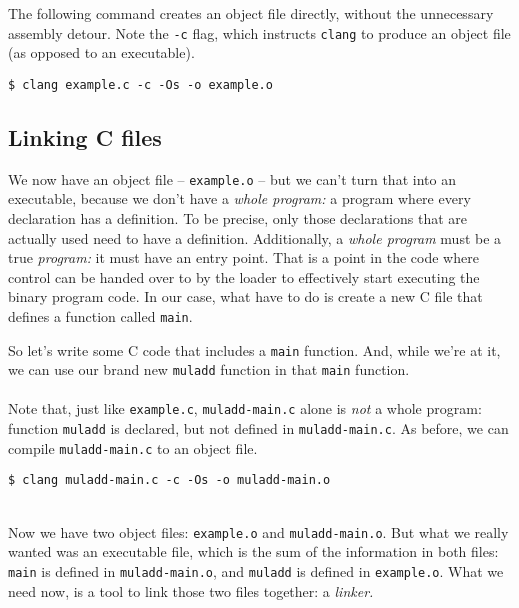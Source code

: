\documentclass[12pt,a4paper]{article}
\newcommand{\C}{C}
\newcommand{\clang}{\texttt{clang}}
\newcommand{\CC}{\clang{}}
\newcommand{\labelname}[1]{\texttt{#1}}
\newcommand{\functionname}[1]{\labelname{#1}}
\newcommand{\filename}[1]{\texttt{#1}}
\begin{document}
The following command creates an object file directly, without the unnecessary assembly detour. Note the \texttt{-c} flag, which instructs \CC{} to produce an object file (as opposed to an executable).\\

\begin{lstlisting}[caption=compiling \filename{example.c} to an object file]
$ clang example.c -c -Os -o example.o
\end{lstlisting}

\subsection{Linking \C{} files}

We now have an object file -- \filename{example.o} -- but we can't turn that into an executable, because we don't have a \emph{whole program:} a program where every declaration has a definition. To be precise, only those declarations that are actually used need to have a definition. Additionally, a \emph{whole program} must be a true \emph{program:} it must have an entry point. That is a point in the code where control can be handed over to by the loader to effectively start executing the binary program code. In our case, what have to do is create a new \C{} file that defines a function called \functionname{main}. 

So let's write some \C{} code that includes a \functionname{main} function. And, while we're at it, we can use our brand new \functionname{muladd} function in that \functionname{main} function.\\


\ \\
\noindent Note that, just like \filename{example.c}, \filename{muladd-main.c} alone is \emph{not} a whole program: function \functionname{muladd} is declared, but not defined in \filename{muladd-main.c}. As before, we can compile \filename{muladd-main.c} to an object file.\\

\begin{lstlisting}[caption=compiling \filename{muladd-main.c} to an object file]
$ clang muladd-main.c -c -Os -o muladd-main.o
\end{lstlisting}
\ \\
Now we have two object files: \filename{example.o} and \filename{muladd-main.o}. But what we really wanted was an executable file, which is the sum of the information in both files: \functionname{main} is defined in \filename{muladd-main.o}, and \functionname{muladd} is defined in \filename{example.o}. What we need now, is a tool to link those two files together: a \emph{linker.} 
\end{document}
